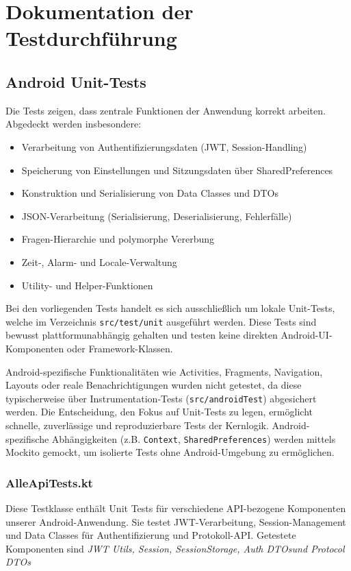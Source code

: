 \section{Dokumentation der Testdurchführung}


\subsection{Android Unit-Tests}
Die Tests zeigen, dass zentrale Funktionen der Anwendung korrekt arbeiten. 
Abgedeckt werden insbesondere:

\begin{itemize}
  \item Verarbeitung von Authentifizierungsdaten (JWT, Session-Handling)
  \item Speicherung von Einstellungen und Sitzungsdaten über SharedPreferences
  \item Konstruktion und Serialisierung von Data Classes und DTOs
  \item JSON-Verarbeitung (Serialisierung, Deserialisierung, Fehlerfälle)
  \item Fragen-Hierarchie und polymorphe Vererbung
  \item Zeit-, Alarm- und Locale-Verwaltung
  \item Utility- und Helper-Funktionen
\end{itemize}
Bei den vorliegenden Tests handelt es sich ausschließlich um lokale
Unit-Tests, welche im Verzeichnis \texttt{src/test/unit} ausgeführt werden.
Diese Tests sind bewusst plattformunabhängig gehalten und testen keine
direkten Android-UI-Komponenten oder Framework-Klassen.

Android-spezifische Funktionalitäten wie Activities, Fragments,
Navigation, Layouts oder reale Benachrichtigungen wurden nicht getestet,
da diese typischerweise über Instrumentation-Tests
(\texttt{src/androidTest}) abgesichert werden.
Die Entscheidung, den Fokus auf Unit-Tests zu legen, ermöglicht schnelle,
zuverlässige und reproduzierbare Tests der Kernlogik. Android-spezifische Abhängigkeiten (z.B. \texttt{Context}, \texttt{SharedPreferences}) werden mittels Mockito gemockt, um isolierte Tests ohne Android-Umgebung zu ermöglichen.
\subsubsection{AlleApiTests.kt}
Diese Testklasse enthält Unit Tests für verschiedene API-bezogene Komponenten unserer Android-Anwendung. Sie testet JWT-Verarbeitung, Session-Management und Data Classes für Authentifizierung und Protokoll-API.
Getestete Komponenten sind \textit{JWT Utils, Session, SessionStorage, Auth DTOsund Protocol DTOs}\\



